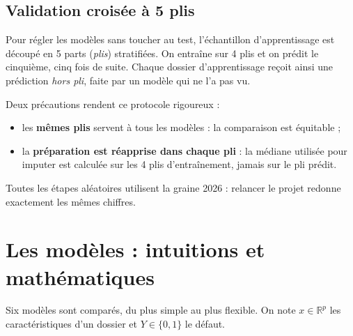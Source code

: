 \documentclass[11pt,a4paper]{article}
\begin{document}
\subsection{Validation croisée à 5 plis}
Pour régler les modèles sans toucher au test, l'échantillon d'apprentissage est découpé en 5 parts (\emph{plis}) stratifiées. On entraîne sur 4 plis et on prédit le cinquième, cinq fois de suite. Chaque dossier d'apprentissage reçoit ainsi une prédiction \emph{hors pli}, faite par un modèle qui ne l'a pas vu.

\begin{center}
\end{center}

Deux précautions rendent ce protocole rigoureux :
\begin{itemize}
\item les \textbf{mêmes plis} servent à tous les modèles : la comparaison est équitable ;
\item la \textbf{préparation est réapprise dans chaque pli} : la médiane utilisée pour imputer est calculée sur les 4 plis d'entraînement, jamais sur le pli prédit.
\end{itemize}
Toutes les étapes aléatoires utilisent la graine 2026 : relancer le projet redonne exactement les mêmes chiffres.

\section{Les modèles : intuitions et mathématiques}

Six modèles sont comparés, du plus simple au plus flexible. On note $x \in \mathbb{R}^p$ les caractéristiques d'un dossier et $Y \in \{0,1\}$ le défaut.
\end{document}
